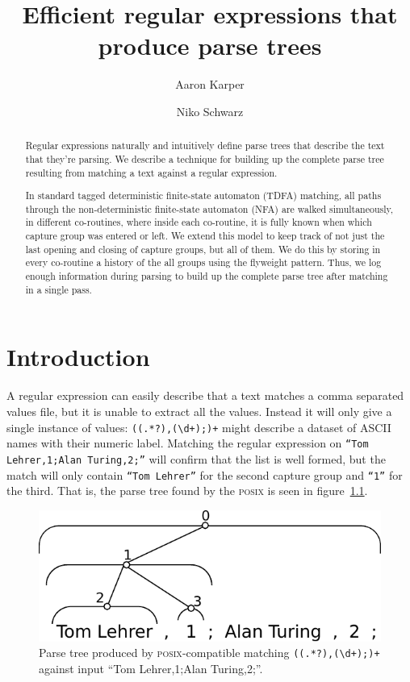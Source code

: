 \documentclass[11pt]{Thesis}
\author{Aaron Karper \and Niko Schwarz}
\theoremstyle{definition}
\newcommand{\Figref}[1]{figure~\ref{fig:#1}}
\newcommand{\figlabel}[1]{\label{fig:#1}}
\begin{document}
\setlength{\pdfpageheight}{\paperheight}
\setlength{\pdfpagewidth}{\paperwidth}

\frenchspacing

\title{Efficient regular expressions that produce parse trees}

\maketitle

\begin{abstract}
Regular expressions naturally and intuitively define parse trees that describe
the text that they're parsing.  We describe a technique for building up the
complete parse tree resulting from matching a text against a regular
expression.

In standard tagged deterministic finite-state automaton (TDFA) matching, all
paths through the non-deterministic finite-state automaton (NFA) are walked
simultaneously, in different co-routines, where inside each co-routine, it is
fully known when which capture group was entered or left. We extend this model
to keep track of not just the last opening and closing of capture groups, but
all of them. We do this by storing in every co-routine a history of the all
groups using the flyweight pattern.  Thus, we log enough information during
parsing to build up the complete parse tree after matching in a single pass.

\end{abstract}


\chapter{Introduction}

A regular expression can easily describe that a text matches a comma
separated values file, but it is unable to extract all the values.
Instead it will only give a single instance of values:
\texttt{((.*?),(\textbackslash d+);)+} might describe a dataset of ASCII names
with their numeric label. Matching the regular expression on \texttt{``Tom
Lehrer,1;Alan Turing,2;''} will confirm that the list is well formed, but the
match will only contain \texttt{``Tom Lehrer''} for the second capture group
and \texttt{``1''} for the third. That is, the parse tree found by the
\textsc{posix} is seen in \Figref{posix}.

\begin{figure}[htp]
\centering
\includegraphics[width=.75\linewidth]{graphs/posix_parse}
\caption{\figlabel{lehrer-posix} Parse tree produced by
\textsc{posix}-compatible matching \texttt{((.*?),(\textbackslash d+);)+}
against input ``Tom Lehrer,1;Alan Turing,2;''.}
\figlabel{posix}
\end{figure}
\end{document}
